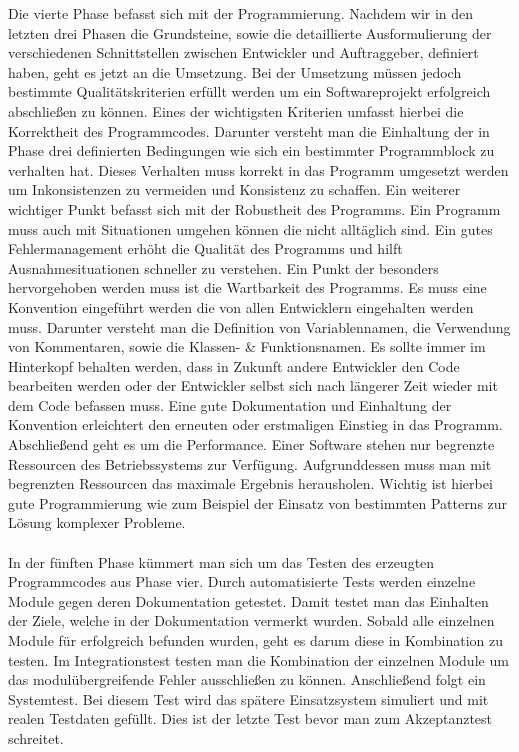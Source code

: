 \documentclass{llncs}
\begin{document}
Die vierte Phase befasst sich mit der Programmierung. Nachdem wir in den letzten drei Phasen die Grundsteine, sowie die detaillierte Ausformulierung der verschiedenen Schnittstellen zwischen Entwickler und Auftraggeber, definiert haben, geht es jetzt an die Umsetzung. Bei der Umsetzung müssen jedoch bestimmte Qualitätskriterien erfüllt werden um ein Softwareprojekt erfolgreich abschließen zu können. Eines der wichtigsten Kriterien umfasst hierbei die Korrektheit des Programmcodes. Darunter versteht man die Einhaltung der in Phase drei definierten Bedingungen wie sich ein bestimmter Programmblock zu verhalten hat. Dieses Verhalten muss korrekt in das Programm umgesetzt werden um Inkonsistenzen zu vermeiden und Konsistenz zu schaffen. Ein weiterer wichtiger Punkt befasst sich mit der Robustheit des Programms. Ein Programm muss auch mit Situationen umgehen können die nicht alltäglich sind. Ein gutes Fehlermanagement erhöht die Qualität des Programms und hilft Ausnahmesituationen schneller zu verstehen. Ein Punkt der besonders hervorgehoben werden muss ist die Wartbarkeit des Programms. Es muss eine Konvention eingeführt werden die von allen Entwicklern eingehalten werden muss. Darunter versteht man die Definition von Variablennamen, die Verwendung von Kommentaren, sowie die Klassen- \& Funktionsnamen. Es sollte immer im Hinterkopf behalten werden, dass in Zukunft andere Entwickler den Code bearbeiten werden oder der Entwickler selbst sich nach längerer Zeit wieder mit dem Code befassen muss. Eine gute Dokumentation und Einhaltung der Konvention erleichtert den erneuten oder erstmaligen Einstieg in das Programm. Abschließend geht es um die Performance. Einer Software stehen nur begrenzte Ressourcen des Betriebssystems zur Verfügung. Aufgrunddessen muss man mit begrenzten Ressourcen das maximale Ergebnis herausholen. Wichtig ist hierbei gute Programmierung wie zum Beispiel der Einsatz von bestimmten Patterns zur Lösung komplexer Probleme.
\\ \\
In der fünften Phase kümmert man sich um das Testen des erzeugten Programmcodes aus Phase vier. Durch automatisierte Tests werden einzelne Module gegen deren Dokumentation getestet. Damit testet man das Einhalten der Ziele, welche in der Dokumentation vermerkt wurden. Sobald alle einzelnen Module für erfolgreich befunden wurden, geht es darum diese in Kombination zu testen. Im Integrationstest testen man die Kombination der einzelnen Module um das modulübergreifende Fehler ausschließen zu können. Anschließend folgt ein Systemtest. Bei diesem Test wird das spätere Einsatzsystem simuliert und mit realen Testdaten gefüllt. Dies ist der letzte Test bevor man zum Akzeptanztest schreitet. 
\end{document}
